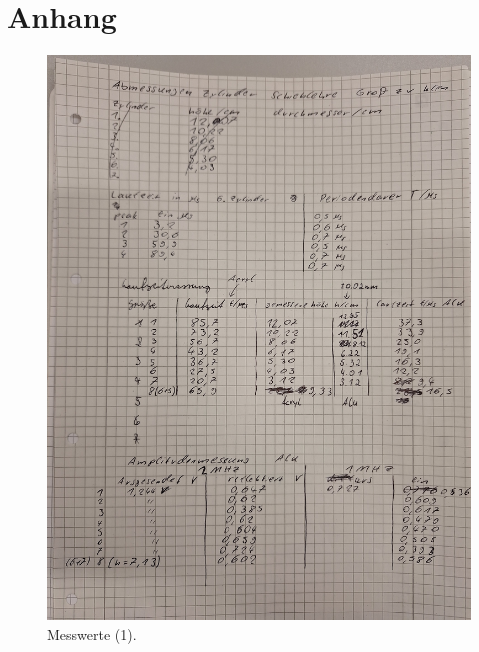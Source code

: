 \section{Anhang}
\label{sec:Anhang}

\begin{figure}[H]
    \centering
        \centering
        \includegraphics[width=\textwidth, angle=-90]{bilder/mw1.jpg}
        \caption{Messwerte (1).}
    \hfill
\end{figure}
